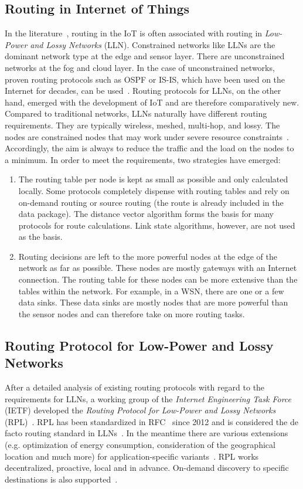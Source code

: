 \documentclass[english,version-2019-11]{uzl-thesis}
\begin{document}
\subsection{Routing in Internet of Things}
In the literature~\cite{RoutingIssuesSurvey}\cite{routingSurvey}, routing in the IoT is often associated
with routing in \emph{Low-Power and Lossy Networks} (LLN). Constrained networks like LLNs are the dominant network type
at the edge and sensor layer. There are unconstrained networks at the fog and cloud layer.
In the case of unconstrained networks, proven routing protocols such as OSPF or IS-IS,
which have been used on the Internet for decades, can be used~\cite{Tanenbaum}.
Routing protocols for LLNs, on the other hand,
emerged with the development of IoT and are therefore comparatively new.
Compared to traditional networks, LLNs naturally have different
routing requirements. They are typically wireless, meshed, multi-hop, and lossy.
The nodes are constrained nodes that may work under severe resource constraints~\cite{rfc7228}.
Accordingly, the aim is always to reduce the traffic and the load on the nodes
to a minimum. In order to meet the requirements, two strategies have emerged:
\begin{enumerate}
 \item The routing table per node is kept as small as possible and only calculated locally.
 Some protocols completely dispense with routing tables and rely on on-demand routing or source routing
 (the route is already included in the data package). The distance vector algorithm forms the basis
 for many protocols for route calculations. Link state algorithms, however, are not used as the basis.
 \item Routing decisions are left to the more powerful nodes at the edge of the network
 as far as possible. These nodes are mostly gateways with an Internet connection.
 The routing table for these nodes can be more extensive than the tables within the network.
 For example, in a WSN, there are one or a few data sinks. These data sinks are mostly
 nodes that are more powerful than the sensor nodes and can therefore take on more routing tasks.
\end{enumerate}

\subsection{Routing Protocol for Low-Power and Lossy Networks}
After a detailed analysis of existing routing protocols with regard
to the requirements for LLNs, a working group of the
\emph{Internet Engineering Task Force} (IETF) developed the
\emph{Routing Protocol for Low-Power and Lossy Networks} (RPL)~\cite{RPLApplications}.
RPL has been standardized in RFC~\cite{rfc6550} since 2012 and is considered
the de facto routing standard in LLNs~\cite{RPLApplications}.
In the meantime there are various extensions (e.g. optimization
of energy consumption, consideration of the geographical
location and much more) for application-specific variants~\cite{RPLApplications}.
RPL works decentralized, proactive, local and in advance.
On-demand discovery to specific destinations is also supported~\cite{rfc6550}.
\end{document}
